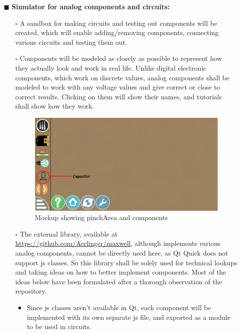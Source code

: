 \documentclass[preprint,12pt]{elsarticle}
\begin{document}
\begin{itemize}
			\item[$\blacksquare$] \textbf{Simulator for analog components and circuits:}
				\begin{itemize}
				\item[$\square$] {A sandbox for making circuits and testing out components will be created, which will enable adding/removing components, connecting various circuits and testing them out.}
				\item[$\square$] {Components will be modeled as closely as possible to represent how they actually look and work in real life. Unlike digital electronic components, which work on discrete values, analog components shall be modeled to work with any voltage values and give correct or close to correct results. Clicking on them will show their names, and tutorials shall show how they work.}
				
				\begin{figure}[H]
				\centering\includegraphics[width=0.9\linewidth]{./images/gsoc4}
				\caption{Mockup showing pinchArea and components}
				\end{figure}
			
				\item[$\square$] {The external library, available at \href{https://github.com/Aerlinger/maxwell}{https://github.com/Aerlinger/maxwell}, although implements various analog components, cannot be directly used here, as Qt Quick does not support js classes. So this library shall be solely used for technical lookups and taking ideas on how to better implement components. Most of the ideas below have been formulated after a thorough observation of the repository.}
				
					\begin{itemize}
					\item {Since js classes aren’t available in Qt, each component will be implemented with its own separate js file, and exported as a module to be used in circuits.}
					

\end{itemize}
\end{itemize}
\end{itemize}
\end{document}
